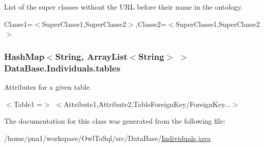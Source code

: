List of the super classes without the URL before their name in the ontology. 

Classe1=$<$SuperClasse1,SuperClasse2$>$,Classe2=$<$SuperClasse1,SuperClasse2$>$ \hypertarget{class_data_base_1_1_individuals_ae6a515b85461d50ad21ac1051c5133b1}{
\subsubsection[{tables}]{\setlength{\rightskip}{0pt plus 5cm}HashMap$<$String, ArrayList$<$String$>$ $>$ {\bf DataBase.Individuals.tables}}}
\label{class_data_base_1_1_individuals_ae6a515b85461d50ad21ac1051c5133b1}


Attributes for a given table. 

$<$Table1 =$>$ $<$Attribute1,Attribute2,TableForeignKey/ForeignKey...$>$ 

The documentation for this class was generated from the following file:\begin{DoxyCompactItemize}
\item 
/home/pna1/workspace/OwlToSql/src/DataBase/\hyperlink{_individuals_8java}{Individuals.java}\end{DoxyCompactItemize}
